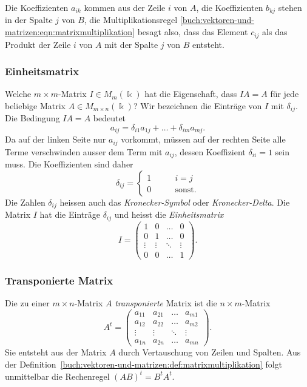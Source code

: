 Die Koeffizienten $a_{ik}$ kommen aus der Zeile $i$ von $A$, die Koeffizienten
$b_{k\!j}$ stehen in der Spalte $j$ von $B$, die Multiplikationsregel
\eqref{buch:vektoren-und-matrizen:eqn:matrixmultiplikation}
besagt also, dass das Element $c_{i\!j}$ als das Produkt
der Zeile $i$ von $A$ mit der Spalte $j$ von $B$ entsteht.

\subsubsection{Einheitsmatrix}
Welche $m\times m$-Matrix $I\in M_{m}(\Bbbk)$ hat die Eigenschaft, dass
$IA=A$ für jede beliebige Matrix $A\in M_{m\times n}(\Bbbk)$?
Wir bezeichnen die Einträge von $I$ mit $\delta_{i\!j}$.
Die Bedingung $IA=A$ bedeutet
\[
a_{i\!j} = \delta_{i1}a_{1j} + \dots + \delta_{im}a_{mj}.
\]
Da auf der linken Seite nur $a_{i\!j}$ vorkommt, müssen
auf der rechten Seite alle Terme
verschwinden ausser dem Term mit $a_{i\!j}$, dessen
Koeffizient $\delta_{ii}=1$ sein muss.
Die Koeffizienten sind daher
\[
\delta_{i\!j}
=
\begin{cases}
1&\qquad i=j\\
0&\qquad\text{sonst.}
\end{cases}
\]
Die Zahlen $\delta_{i\!j}$ heissen auch das {\em Kronecker-Symbol} oder
{\em Kronecker-Delta}.
%
%
Die Matrix $I$ hat die Einträge $\delta_{i\!j}$ und heisst die
{\em Einheitsmatrix}
%
\[
I
=
\begin{pmatrix}
1     &0     &\dots &0     \\
0     &1     &\dots &0     \\[-2pt]
\vdots&\vdots&\ddots&\vdots\\
0     &0     &\dots &1
\end{pmatrix}.
\]

\subsubsection{Transponierte Matrix}
%
%
Die zu einer $m\times n$-Matrix $A$ {\em transponierte} Matrix ist die
$n\times m$-Matrix
\[
A^t=\begin{pmatrix}
a_{11}&a_{21}&\dots&a_{m1}\\
a_{12}&a_{22}&\dots&a_{m2}\\
\vdots&\vdots&\ddots&\vdots\\
a_{1n}&a_{2n}&\dots&a_{mn}
\end{pmatrix}.
\]
Sie entsteht aus der Matrix $A$ durch Vertauschung von Zeilen und Spalten.
Aus der Definition~\ref{buch:vektoren-und-matrizen:def:matrixmultiplikation}
folgt unmittelbar die Rechenregel $(AB)^t = B^tA^t$.

